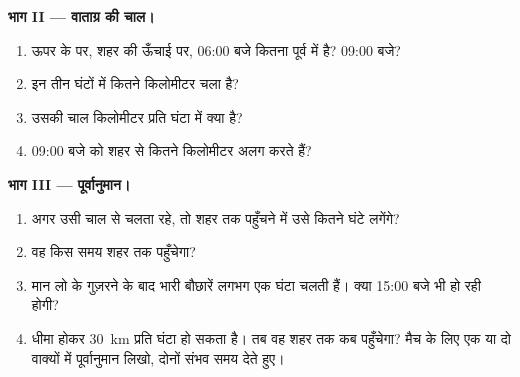 \begin{problem}
\noindent\textbf{भाग II --- वाताग्र की चाल।}\par\nopagebreak
\begin{enumerate}[resume, beginpenalty=10000]
  \item ऊपर के  पर, शहर की ऊँचाई पर, 06:00 बजे  कितना पूर्व में है?
        09:00 बजे?
  \item इन तीन घंटों में  कितने किलोमीटर चला है?
  \item उसकी चाल किलोमीटर प्रति घंटा में क्या है?
  \item 09:00 बजे  को शहर से कितने किलोमीटर अलग करते हैं?
\end{enumerate}

\noindent\textbf{भाग III --- पूर्वानुमान।}\par\nopagebreak
\begin{enumerate}[resume, beginpenalty=10000]
  \item अगर  उसी चाल से चलता रहे, तो शहर तक पहुँचने में उसे कितने घंटे
        लगेंगे?
  \item वह किस समय शहर तक पहुँचेगा?
  \item मान लो  के गुज़रने के बाद भारी बौछारें लगभग एक घंटा चलती हैं। क्या
        15:00 बजे भी  हो रही होगी?
  \item {} धीमा होकर \qty{30}{km} प्रति घंटा हो सकता है। तब वह शहर तक कब
        पहुँचेगा? मैच के लिए एक या दो वाक्यों में पूर्वानुमान लिखो, दोनों संभव समय
        देते हुए।
\end{enumerate}
\end{problem}
